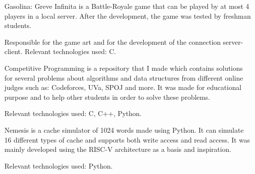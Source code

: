\documentclass[]{deedy-resume-openfont}
\begin{document}
\begin{minipage}[t]{0.66\textwidth}
\begin{tightemize}
\item {Gasolina: Greve Infinita is a Battle-Royale game that can be played by at most 4 players in a local server. After the development, the game was tested by freshman students.}
\item {Responsible for the game art and for the development of the connection server-client. Relevant technologies used: C.}
\end{tightemize}

\begin{tightemize}
\item {Competitive Programming is a repository that I made which contains solutions for several problems about algorithms and data structures from different online judges such as: Codeforces, UVa, SPOJ and more. It was made for educational purpose and to help other students in order to solve these problems.}
\item {Relevant technologies used: C, C++, Python.}
\end{tightemize}

\begin{tightemize}
\item {Nemesis is a cache simulator of 1024 words made using Python. It can simulate 16 different types of cache and supports both write access and read access. It was mainly developed using the RISC-V architecture as a basis and inspiration.}
\item {Relevant technologies used: Python.}
\end{tightemize}




\end{minipage}
\end{document}
